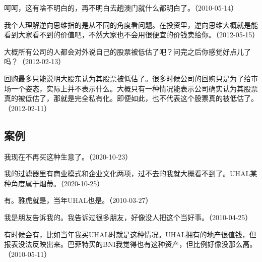 
呵呵，这有啥不明白的，再不明白去趟澳门就什么都明白了。（2010-05-14）

我个人理解逆向思维指的是从不同的角度看问题。在投资里，逆向思维大概就是能看到大家看不到的价值吧，不然大家也不会用很便宜的价钱卖给你。（2012-05-15）


大概所有公司的人都会对外说自己的股票被低估了吧？问完之后你感觉好点儿了吗？（2012-02-13）


回购最多只能说明大股东认为其股票被低估了。很多时候公司的回购只是为了给市场一个姿态，实际上并不表示什么。大概只有一种情况能表示公司确实认为其股票真的被低估了，那就是完全私有化。即便如此，也不代表这个股票真的被低估了。（2012-02-11）

\subsection{案例}



我现在不再买这种生意了。（2020-10-23）

我的过滤器里有商业模式和企业文化两项，过不去的我就大概看不到了。UHAL某种角度属于烟蒂。（2020-10-25）


有。雅虎就是，当年UHAL也是。（2010-03-27）


我是朋友告诉我的。我告诉过很多朋友，好像没人把这个当好事。（2010-04-25）


有时候会有，比如当年我买UHAL时就是这种情况。UHAL拥有的地产很值钱，但报表没法反映出来。巴菲特买的BNI我觉得也有这种资产，但比例好像没那么高。（2010-05-11）


